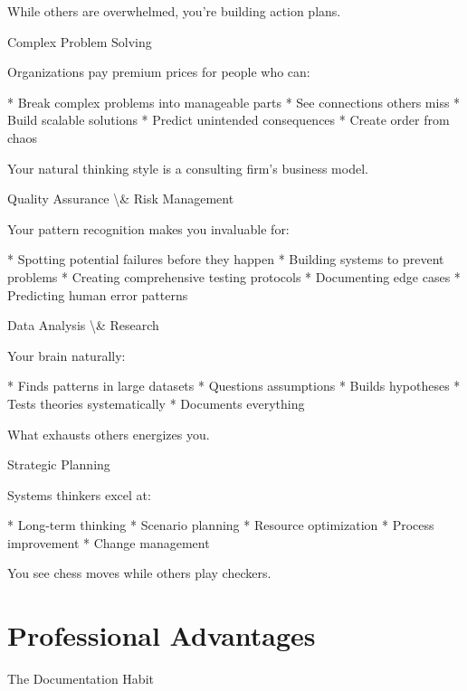 \documentclass[12pt,oneside]{book}
\begin{document}
While others are overwhelmed, you're building action plans.

                Complex Problem Solving
                
Organizations pay premium prices for people who can:

                    * Break complex problems into manageable parts
                    * See connections others miss
                    * Build scalable solutions
                    * Predict unintended consequences
                    * Create order from chaos

Your natural thinking style is a consulting firm's business model.

                Quality Assurance \textbackslash{}& Risk Management
                
Your pattern recognition makes you invaluable for:

                    * Spotting potential failures before they happen
                    * Building systems to prevent problems
                    * Creating comprehensive testing protocols
                    * Documenting edge cases
                    * Predicting human error patterns

                Data Analysis \textbackslash{}& Research
                
Your brain naturally:

                    * Finds patterns in large datasets
                    * Questions assumptions
                    * Builds hypotheses
                    * Tests theories systematically
                    * Documents everything

What exhausts others energizes you.

                Strategic Planning
                
Systems thinkers excel at:

                    * Long-term thinking
                    * Scenario planning
                    * Resource optimization
                    * Process improvement
                    * Change management

You see chess moves while others play checkers.

\section{Professional Advantages}

                The Documentation Habit
                
\end{document}
